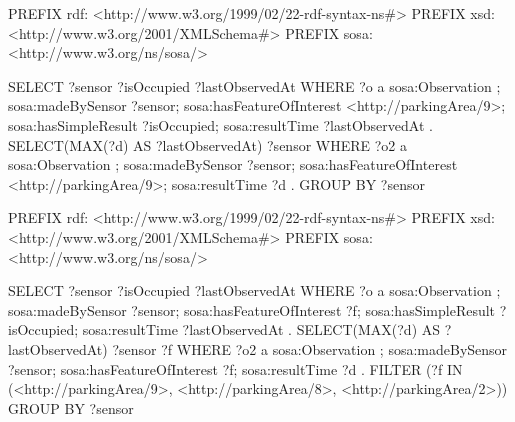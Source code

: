 \documentclass[english,version-2019-11]{uzl-thesis}
\begin{document}
\begin{SPARQL}[caption={Returns the latest samples of all sensors from parking area number 9.},
  float, label=appendix_query_6, morekeywords={@prefix}, captionpos=b]
PREFIX rdf: <http://www.w3.org/1999/02/22-rdf-syntax-ns#>
PREFIX xsd: <http://www.w3.org/2001/XMLSchema#>
PREFIX sosa: <http://www.w3.org/ns/sosa/>

SELECT ?sensor ?isOccupied ?lastObservedAt
WHERE {
 ?o a sosa:Observation ;
 sosa:madeBySensor ?sensor;
 sosa:hasFeatureOfInterest <http://parkingArea/9>;
 sosa:hasSimpleResult ?isOccupied;
 sosa:resultTime ?lastObservedAt .
 {
   SELECT(MAX(?d) AS ?lastObservedAt) ?sensor WHERE{
     ?o2 a sosa:Observation ;
     sosa:madeBySensor ?sensor;
     sosa:hasFeatureOfInterest <http://parkingArea/9>;
     sosa:resultTime ?d .
   }
   GROUP BY ?sensor
 }
}
\end{SPARQL}

\begin{SPARQL}[caption={Returns the latest samples of all sensors from the parking areas number 9, number 8 and number 2.},
  float, label=appendix_query_7, morekeywords={@prefix}, captionpos=b]
PREFIX rdf: <http://www.w3.org/1999/02/22-rdf-syntax-ns#>
PREFIX xsd: <http://www.w3.org/2001/XMLSchema#>
PREFIX sosa: <http://www.w3.org/ns/sosa/>

SELECT ?sensor ?isOccupied ?lastObservedAt
WHERE {
 ?o a sosa:Observation ;
 sosa:madeBySensor ?sensor;
 sosa:hasFeatureOfInterest ?f;
 sosa:hasSimpleResult ?isOccupied;
 sosa:resultTime ?lastObservedAt .
 {
   SELECT(MAX(?d) AS ?lastObservedAt) ?sensor ?f WHERE{
     ?o2 a sosa:Observation ;
     sosa:madeBySensor ?sensor;
     sosa:hasFeatureOfInterest ?f;
     sosa:resultTime ?d .
     FILTER (?f IN (<http://parkingArea/9>, <http://parkingArea/8>, <http://parkingArea/2>))
   }
   GROUP BY ?sensor
 }
}
\end{SPARQL}
\end{document}
